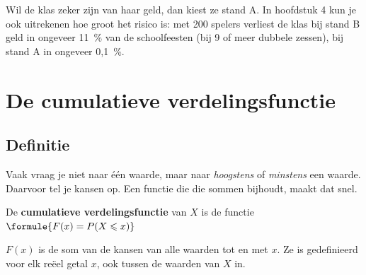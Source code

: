 Wil de klas zeker zijn van haar geld, dan kiest ze stand A. In hoofdstuk 4 kun je ook uitrekenen hoe groot het risico is: met 200 spelers verliest de klas bij stand B geld in ongeveer 11~\% van de schoolfeesten (bij 9 of meer dubbele zessen), bij stand A in ongeveer 0,1~\%.

\section{De cumulatieve verdelingsfunctie}

\subsection{Definitie}

Vaak vraag je niet naar één waarde, maar naar \textit{hoogstens} of \textit{minstens} een waarde. Daarvoor tel je kansen op. Een functie die die sommen bijhoudt, maakt dat snel.

\begin{theorie}
De \textbf{\textcolor{accent}{cumulatieve verdelingsfunctie}} van $X$ is de functie \quad $\formule{F(x) = P(X \leqslant x)}$
\end{theorie}

$F(x)$ is de som van de kansen van alle waarden tot en met $x$. Ze is gedefinieerd voor elk reëel getal $x$, ook tussen de waarden van $X$ in.

